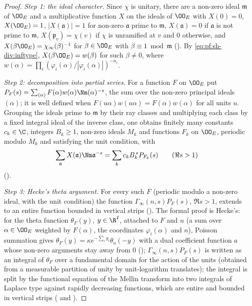 \begin{proof}
\emph{Step 1: the ideal character.} Since $\chi$ is unitary, there are a non-zero ideal $\mathfrak m$ of $\OO_E$ and a
multiplicative function $X$ on the ideals of $\OO_E$ with $X(0)=0$, $X(\OO_E)=1$, $|X(\mathfrak a)|=1$ for non-zero $\mathfrak a$
prime to $\mathfrak m$, $X(\mathfrak a)=0$ if $\mathfrak a$ is not prime to $\mathfrak m$, $X(\mathfrak p_v)=\chi(v)$ if $\chi$ is
unramified at $v$ and $0$ otherwise, and $X(\beta\OO_E)=\chi_\infty(\beta)^{-1}$ for $\beta\in\OO_E$ with $\beta\equiv1\bmod\mathfrak m$
(). By \eqref{eq:pf:sh-div:inftype},
$X(\beta\OO_E)=w(\beta)$ for such $\beta\ne0$, where $w(\alpha)=\prod_i(\varphi_i(\alpha)/|\varphi_i(\alpha)|)^{-n_i}$.

\emph{Step 2: decomposition into partial series.} For a function $F$ on $\OO_E$ put
$P_F(s)=\sum_{(\alpha)}F(\alpha)w(\alpha)\Nm(\alpha)^{-s}$, the sum over the non-zero principal ideals $(\alpha)$; it is well defined
when $F(u\alpha)w(u\alpha)=F(\alpha)w(\alpha)$ for all units $u$. Grouping the ideals prime to $\mathfrak m$ by their ray classes and
multiplying each class by a fixed integral ideal of the inverse class, one obtains finitely many constants $c_k\in\C$, integers
$B_k\ge1$, non-zero ideals $M_k$ and functions $F_k$ on $\OO_E$, periodic modulo $M_k$ and satisfying the unit condition, with
\[
\sum_{\mathfrak a}X(\mathfrak a)\Nm\mathfrak a^{-s}=\sum_kc_kB_k^{\,s}P_{F_k}(s)\qquad(\Re s>1)
\]
().

\emph{Step 3: Hecke's theta argument.} For every such $F$ (periodic modulo a non-zero ideal, with the unit condition) the
function $\Gamma_\infty(n,s)P_F(s)$, $\Re s>1$, extends to an entire function bounded in vertical strips
(). The formal proof is Hecke's: for the theta
function $\theta_F(y)$, $y\in\R^I$, attached to $F$ and $n$ (a sum over $\alpha\in\OO_E$ weighted by $F(\alpha)$, the coordinates
$\varphi_i(\alpha)$ and $n$), Poisson summation gives $\theta_F(y)=\kappa e^{-\sum_iy_i}\theta_a(-y)$ with a dual coefficient function $a$
whose non-zero arguments stay away from $0$ (); $\Gamma_\infty(n,s)P_F(s)$ is
written as an integral of $\theta_F$ over a fundamental domain for the action of the units (obtained from a measurable partition of
unity by unit-logarithm translates); the integral is split by the functional equation of the Mellin transform into two integrals
of Laplace type against rapidly decreasing functions, which are entire and bounded in vertical strips
( and ).


\end{proof}
